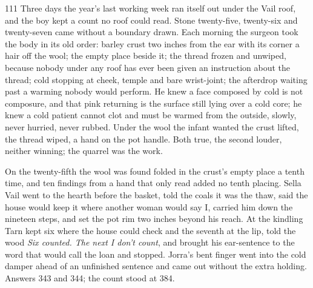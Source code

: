 
\scenebreak


\scenebreak


\scenebreak

\CRtailpiece
\begin{CRchronicle}{111}
Three days the year’s last working week ran itself out under the Vail roof, and the boy kept a count no roof could read. Stone twenty-five, twenty-six and twenty-seven came without a boundary drawn. Each morning the surgeon took the body in its old order: barley crust two inches from the ear with its corner a hair off the wool; the empty place beside it; the thread frozen and unwiped, because nobody under any roof has ever been given an instruction about the thread; cold stopping at cheek, temple and bare wrist-joint; the afterdrop waiting past a warming nobody would perform. He knew a face composed by cold is not composure, and that pink returning is the surface still lying over a cold core; he knew a cold patient cannot clot and must be warmed from the outside, slowly, never hurried, never rubbed. Under the wool the infant wanted the crust lifted, the thread wiped, a hand on the pot handle. Both true, the second louder, neither winning; the quarrel was the work.

On the twenty-fifth the wool was found folded in the crust’s empty place a tenth time, and ten findings from a hand that only read added no tenth placing. Sella Vail went to the hearth before the basket, told the coals it was the thaw, said the house would keep it where another woman would say I, carried him down the nineteen steps, and set the pot rim two inches beyond his reach. At the kindling Tarn kept six where the house could check and the seventh at the lip, told the wood \emph{Six counted. The next I don’t count}, and brought his ear-sentence to the word that would call the loan and stopped. Jorra’s bent finger went into the cold damper ahead of an unfinished sentence and came out without the extra holding. Answers 343 and 344; the count stood at 384.


\end{CRchronicle}
